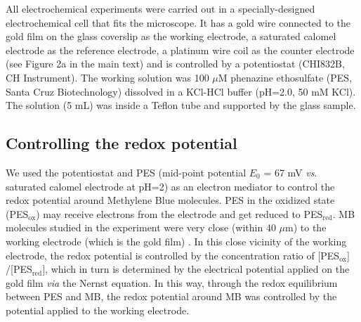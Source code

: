 \documentclass[11pt,a4paper,onecolumn]{article}
\begin{document}
All electrochemical experiments were carried out in a specially-designed electrochemical cell that fits the microscope. It has a gold wire connected to the gold film on the glass coverslip as the working electrode, a saturated calomel electrode as the reference electrode, a platinum wire coil as the counter electrode (see Figure 2a in the main text) and is controlled by a potentiostat
 (CHI832B, CH Instrument). The working solution was 100 $\mu$M phenazine ethosulfate (PES, Santa Cruz Biotechnology) dissolved in a KCl-HCl buffer (pH=2.0, 50 mM KCl). The solution (5 mL) was inside a Teflon tube and supported by the glass sample.

\subsection{Controlling the redox potential} 
We used the potentiostat and PES (mid-point potential $E_0$ = 67 mV \textit{vs}. saturated calomel electrode at pH=2) as an electron mediator to control the redox potential around Methylene Blue molecules. PES in the oxidized state (PES$_\mathrm{ox}$) may receive electrons from the electrode and get reduced to PES$_\mathrm{red}$. MB molecules studied in the experiment were very close (within 40 $\mu$m) to the working electrode (which is the gold film) \cite{bard2000ecbook}. In this close vicinity of the working electrode, the redox potential is controlled by the concentration ratio of [PES$_\mathrm{ox}]$/[PES$_\mathrm{red}]$, which in turn is determined by the electrical potential applied on the gold film \textit{via} the Nernst equation. In this way, through the redox equilibrium between PES and MB, the redox potential around MB was controlled by the potential applied to the working electrode.
\end{document}
